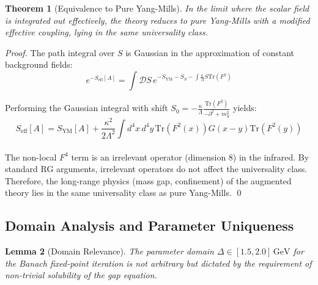 \documentclass[11pt,a4paper]{article}
\renewcommand{\Tr}{\mathrm{Tr}}
\theoremstyle{plain}
\newtheorem{theorem}{Theorem}[section]
\newtheorem{lemma}[theorem]{Lemma}
\theoremstyle{definition}
\begin{document}
\begin{theorem}[Equivalence to Pure Yang-Mills]
\label{thm:pure_ym_equivalence}
In the limit where the scalar field is integrated out effectively, the theory reduces to pure Yang-Mills with a modified effective coupling, lying in the same universality class.
\end{theorem}

\begin{proof}
The path integral over $S$ is Gaussian in the approximation of constant background fields:
\begin{equation}
e^{-S_{\mathrm{eff}}[A]} = \int \mathcal{D}S\,
e^{-S_{\mathrm{YM}} - S_S - \int \frac{\kappa}{\Lambda} S \Tr(F^2)}
\end{equation}

Performing the Gaussian integral with shift $S_0 = -\frac{\kappa}{\Lambda}
\frac{\Tr(F^2)}{-\partial^2 + m_S^2}$ yields:
\begin{equation}
S_{\mathrm{eff}}[A] = S_{\mathrm{YM}}[A] + \frac{\kappa^2}{2\Lambda^2}
\int d^4x\, d^4y\, \Tr(F^2(x)) G(x-y) \Tr(F^2(y))
\end{equation}
\vspace{0.3em}\\
The non-local $F^4$ term is an irrelevant operator (dimension 8) in the infrared. By standard RG arguments, irrelevant operators do not affect the universality class. Therefore, the long-range physics (mass gap, confinement) of the augmented theory lies in the same universality class as pure Yang-Mills. \qed
\end{proof}
\newpage
\subsection{Domain Analysis and Parameter Uniqueness}

\begin{lemma}[Domain Relevance]
\label{lem:domain_relevance}
The parameter domain $\Delta \in [1.5, 2.0]\,\mathrm{GeV}$ for the Banach fixed-point iteration is not arbitrary but dictated by the requirement of non-trivial solubility of the gap equation.
\end{lemma}
\end{document}
